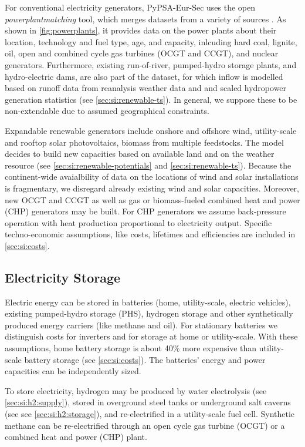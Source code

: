 For conventional electricity generators, PyPSA-Eur-Sec uses the open
\textit{powerplantmatching} tool, which merges datasets from a variety of
sources . As shown in \cref{fig:powerplants}, it
provides data on the power plants about their location, technology and fuel
type, age, and capacity, inlcuding hard coal, lignite, oil, open and combined
cycle gas turbines (OCGT and CCGT), and nuclear generators. Furthermore,
existing run-of-river, pumped-hydro storage plants, and hydro-electric dams, are
also part of the dataset, for which inflow is modelled based on runoff data from
reanalysis weather data and and scaled hydropower generation statistics (see
\cref{sec:si:renewable-ts}). In general, we suppose these to be non-extendable due to assumed
geographical constraints.

Expandable renewable generators include onshore and offshore wind, utility-scale
and rooftop solar photovoltaics, biomass from multiple feedstocks. The model
decides to build new capacities based on available land and on the weather
resource (see \cref{sec:si:renewable-potentials} and
\cref{sec:si:renewable-ts}). Because the continent-wide avaialbility of data on
the locations of wind and solar installations is fragmentary, we disregard
already existing wind and solar capacities. Moreover, new OCGT and CCGT as well
as gas or biomass-fueled combined heat and power (CHP) generators may be built.
For CHP generators we assume back-pressure operation with heat production
proportional to electricity output. Specific techno-economic assumptions, like
costs, lifetimes and efficiencies are included in \cref{sec:si:costs}.

\subsection{Electricity Storage}
\label{sec:si:electricity:storage}

Electric energy can be stored in batteries (home, utility-scale, electric
vehicles), existing pumped-hydro storage (PHS), hydrogen storage and other
synthetically produced energy carriers (like methane and oil). For stationary
batteries we distinguish costs for inverters and for storage at home or
utility-scale. With these assumptions, home battery storage is about 40\% more
expensive than utility-scale battery storage (see \cref{sec:si:costs}). The
batteries' energy and power capacities can be independently sized.

To store electricity, hydrogen may be produced by water electrolysis (see \cref{sec:si:h2:supply}),
stored in overground steel tanks or underground salt caverns (see see \cref{sec:si:h2:storage}), and
re-electrified in a utility-scale fuel cell. Synthetic methane can be
re-electrified through an open cycle gas turbine (OCGT) or a combined heat and
power (CHP) plant.

